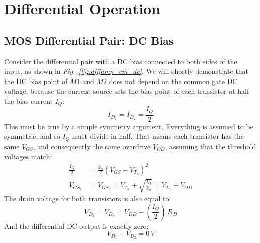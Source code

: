 \newpage
\section{Differential Operation}
\subsection{MOS Differential Pair:  DC Bias}
Consider the differential pair with a DC bias connected to both sides of the input, as shown in \emph{Fig.~\ref{fig:diffamp_cm_dc}}.  We will shortly demonstrate that the DC bias point of $M1$ and $M2$ does not depend on the common gate DC voltage, because the current source sets the bias point of each transistor at half the bias current $I_Q$:
    \begin{equation}
        I_{D_1} = I_{D_2} = \frac{I_Q}{2}
    \end{equation}
This must be true by a simple symmetry argument.  Everything is assumed to be symmetric, and so $I_Q$ must divide in half.  That means each transistor has the same $V_{GS}$, and consequently the same overdrive $V_{OD}$, assuming that the threshold voltages match:
    \begin{align}
        \frac{I_Q}{2} &= \frac{k_n}{2}{\left(V_{GS} - V_{T_n}\right)^2}\\[0.25cm]
        V_{GS_1} &= V_{GS_2} = {V_{T_n}} + \sqrt{\frac{I_Q}{k_n}} = V_{T_n} + V_{OD}
    \end{align}
The drain voltage for both transistors is also equal to:
    \begin{equation}
        V_{D_1} = V_{D_2} = V_{DD} - \left(\frac{I_Q}{2}\right)\,R_D
    \end{equation}
And the differential DC output is exactly zero:
    \begin{equation}
        V_{D_1} - V_{D_2} = 0\,V
    \end{equation}
